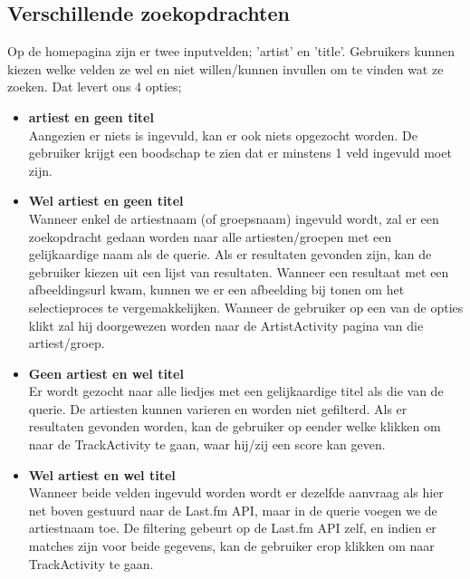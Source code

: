 \documentclass[11pt,a4paper]{article}
\begin{document}
	\subsection{Verschillende zoekopdrachten}
	Op de homepagina zijn er twee inputvelden; 'artist' en 'title'. Gebruikers kunnen kiezen welke velden ze wel en niet willen/kunnen invullen om te vinden wat ze zoeken. Dat levert ons 4 opties;
		\begin{itemize}
			\item \textbf{artiest en geen titel} \\
		Aangezien er niets is ingevuld, kan er ook niets opgezocht worden. De gebruiker krijgt een boodschap te zien dat er minstens 1 veld ingevuld moet zijn. \\
		
			\item \textbf{Wel artiest en geen titel} \\
		Wanneer enkel de artiestnaam (of groepsnaam) ingevuld wordt, zal er een zoekopdracht gedaan worden naar alle artiesten/groepen met een gelijkaardige naam als de querie. Als er resultaten gevonden zijn, kan de gebruiker kiezen uit een lijst van resultaten. Wanneer een resultaat met een afbeeldingsurl kwam, kunnen we er een afbeelding bij tonen om het selectieproces te vergemakkelijken. Wanneer de gebruiker op een van de opties klikt zal hij doorgewezen worden naar de ArtistActivity pagina van die artiest/groep. \\
		
			\item  \textbf{Geen artiest en wel titel} \\
		Er wordt gezocht naar alle liedjes met een gelijkaardige titel als die van de querie. De artiesten kunnen varieren en worden niet gefilterd. Als er resultaten gevonden worden, kan de gebruiker op eender welke klikken om naar de TrackActivity te gaan, waar hij/zij een score kan geven.\\
				
			\item  \textbf{Wel artiest en wel titel} \\
		Wanneer beide velden ingevuld worden wordt er dezelfde aanvraag als hier net boven gestuurd naar de Last.fm API, maar in de querie voegen we de artiestnaam toe. De filtering gebeurt op de Last.fm API zelf, en indien er matches zijn voor beide gegevens, kan de gebruiker erop klikken om naar TrackActivity te gaan.
		\end{itemize}
		
\end{document}
